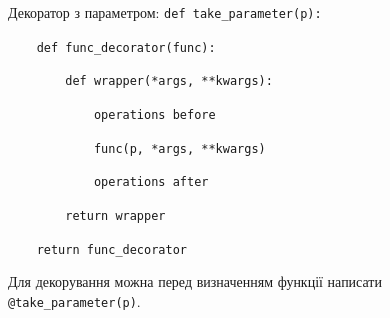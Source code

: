 \begin{frame}
Декоратор з параметром:
\texttt{def take\_parameter(p):}

\texttt{~~~~def func\_decorator(func):}

\texttt{~~~~~~~~def wrapper(*args, **kwargs):}

\texttt{~~~~~~~~~~~~operations before}

\texttt{~~~~~~~~~~~~func(p, *args, **kwargs)}

\texttt{~~~~~~~~~~~~operations after}

\texttt{~~~~~~~~return wrapper}

\texttt{~~~~return func\_decorator}

Для декорування можна перед визначенням функції написати \texttt{@take\_parameter(p)}.
\end{frame}
